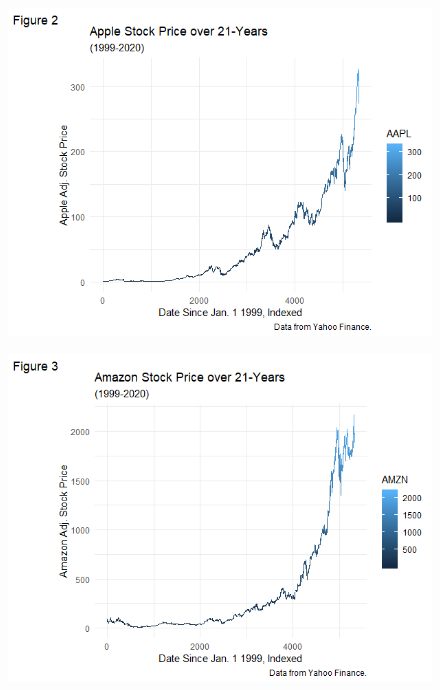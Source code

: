 \documentclass{article}
\begin{document}
    \begin{figure}[htp]
        \includegraphics[width=17cm]{PS6b_Carpenter.png}
    \end{figure}
    \newpage

    \begin{figure}[htp]
        \includegraphics[width=17cm]{PS6c_Carpenter.png}
    \end{figure}
\end{document}
